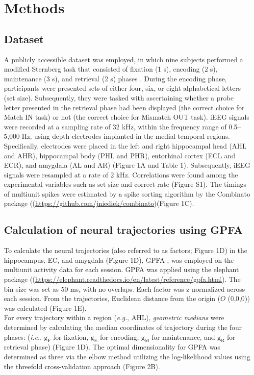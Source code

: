 \section{Methods}
\subsection{Dataset}
A publicly accessible dataset \cite{boran_dataset_2020} was employed, in which nine subjects performed a modified Sternberg task that consisted of fixation (1 s), encoding (2 s), maintenance (3 s), and retrieval (2 s) phases \cite{boran_dataset_2020}. During the encoding phase, participants were presented sets of either four, six, or eight alphabetical letters (set size). Subsequently, they were tasked with ascertaining whether a probe letter presented in the retrieval phase had been displayed (the correct choice for Match IN task) or not (the correct choice for Mismatch OUT task). iEEG signals were recorded at a sampling rate of 32 kHz, within the frequency range of 0.5--5,000 Hz, using depth electrodes implanted in the medial temporal regions. Specifically, electrodes were placed in the left and right hippocampal head (AHL and AHR), hippocampal body (PHL and PHR), entorhinal cortex (ECL and ECR), and amygdala (AL and AR) (Figure 1A and Table 1). Subsequently, iEEG signals were resampled at a rate of 2 kHz. Correlations were found among the experimental variables such as set size and correct rate (Figure S1). The timings of multiunit spikes were estimated by a spike sorting algorithm \cite{niediek_reliable_2016} by the Combinato package ((\url{https://github.com/jniediek/combinato})(Figure 1C).

\subsection{Calculation of neural trajectories using GPFA}
To calculate the neural trajectories (also referred to as factors; Figure 1D) in the hippocampus, EC, and amygdala (Figure 1D), GPFA \cite{yu_gaussian-process_2009}, was employed on the multiunit activity data for each session. GPFA was applied using the elephant package ((\url{https://elephant.readthedocs.io/en/latest/reference/gpfa.html}). The bin size was set as 50 ms, with no overlaps. Each factor was z-normalized across each session. From the trajectories, Euclidean distance from the origin ($O$ (0,0,0)) was calculated (Figure 1E).
\\
\indent
For every trajectory within a region (\textit{e.g.}, AHL), \textit{geometric medians} were determined by calculating the median coordinates of trajectory during the four phases: (\textit{i.e.}, $\mathrm{g_{F}}$ for fixation, $\mathrm{g_{E}}$ for encoding, $\mathrm{g_{M}}$ for maintenance, and $\mathrm{g_{R}}$ for retrieval phase) (Figure 1D). The optimal dimensionality for GPFA was determined as three via the elbow method utilizing the log-likelihood values using the threefold cross-validation approach (Figure 2B).

